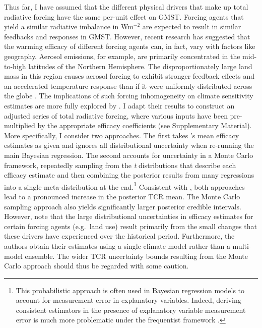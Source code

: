 \documentclass[smallextended]{svjour3}       %
\begin{document}
Thus far, I have assumed that the different physical drivers that make
up total radiative forcing have the same per-unit effect on GMST.
Forcing agents that yield a similar radiative imbalance in Wm\(^{-2}\)
are expected to result in similar feedbacks and responses in GMST.
However, recent research has suggested that the warming efficacy of
different forcing agents can, in fact, vary with factors like geography.
Aerosol emissions, for example, are primarily concentrated in the
mid-to-high latitudes of the Northern Hemisphere. The disproportionately
large land mass in this region causes aerosol forcing to exhibit
stronger feedback effects and an accelerated temperature response than
if it were uniformly distributed across the globe
\cite{shindell2014tcr}. The implications of such forcing inhomogeneity
on climate sensitivity estimates are more fully explored by
\cite{marvel2016implications}. I adapt their results to construct an
adjusted series of total radiative forcing, where various inputs have
been pre-multiplied by the appropriate efficacy coefficients (see
Supplementary Material). More specifically, I consider two approaches.
The first takes \cite{marvel2016implications}'s mean efficacy estimates
as given and ignores all distributional uncertainty when re-running the
main Bayesian regression. The second accounts for uncertainty in a Monte
Carlo framework, repeatedly sampling from the \emph{t} distributions
that describe each efficacy estimate and then combining the posterior
results from many regressions into a single meta-distribution at the
end.\footnote{This probabilistic approach is often used in Bayesian
  regression models to account for measurement error in explanatory
  variables. Indeed, deriving consistent estimators in the presence of
  explanatory variable measurement error is much more problematic under
  the frequentist framework \cite{greene2007econometric}.} Consistent
with \cite{marvel2016implications}, both approaches lead to a pronounced
increase in the posterior TCR mean. The Monte Carlo sampling approach
also yields significantly larger posterior credible intervals. However,
note that the large distributional uncertainties in efficacy estimates
for certain forcing agents (e.g.~land use) result primarily from the
small changes that these drivers have experienced over the historical
period. Furthermore, the authors obtain their estimates using a single
climate model rather than a multi-model ensemble. The wider TCR
uncertainty bounds resulting from the Monte Carlo approach should thus
be regarded with some caution.
\end{document}
